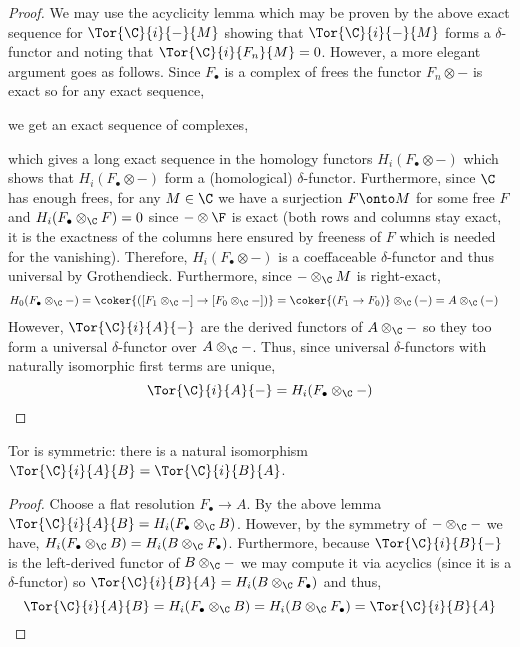 \documentclass[12pt]{article}
\begin{document}
\begin{proof}
We may use the acyclicity lemma which may be proven by the above exact sequence for $\Tor{\C}{i}{-}{M}$ showing that $\Tor{\C}{i}{-}{M}$ forms a $\delta$-functor and noting that $\Tor{\C}{i}{F_n}{M} = 0$. However, a more elegant argument goes as follows. Since $F_\bullet$ is a complex of frees the functor $F_n \otimes -$ is exact so for any exact sequence,
\begin{center}
\end{center}
we get an exact sequence of complexes,
\begin{center}
\end{center}
which gives a long exact sequence in the homology functors $H_i(F_\bullet \otimes -)$ which shows that $H_i(F_\bullet \otimes -)$ form a (homological) $\delta$-functor. Furthermore, since $\C$ has enough frees, for any $M \in \C$ we have a surjection $F \onto M$ for some free $F$ and $H_i(F_\bullet \otimes_\C F) = 0$ since $- \otimes \F$ is exact (both rows and columns stay exact, it is the exactness of the columns here ensured by freeness of $F$ which is needed for the vanishing). Therefore,  $H_i(F_\bullet \otimes -)$ is a coeffaceable $\delta$-functor and thus universal by Grothendieck. Furthermore, since $- \otimes_\C M$ is right-exact,
\begin{align*}
H_0(F_\bullet \otimes_\C -) & = \coker{([F_1 \otimes_\C -] \to [F_0 \otimes_\C -])} = \coker{(F_1 \to F_0)} \otimes_\C (-) = A \otimes_\C (-)
\end{align*}
However, $\Tor{\C}{i}{A}{-}$ are the derived functors of $A \otimes_\C -$ so they too form a universal $\delta$-functor over $A \otimes_\C -$. Thus, since universal $\delta$-functors with naturally isomorphic first terms are unique,
\[ \Tor{\C}{i}{A}{-} = H_i(F_\bullet \otimes_\C -) \]
\end{proof}

\begin{prop}
Tor is symmetric: there is a natural isomorphism $\Tor{\C}{i}{A}{B} = \Tor{\C}{i}{B}{A}$.
\end{prop}

\begin{proof}
Choose a flat resolution $F_\bullet \to A$. By the above lemma $\Tor{\C}{i}{A}{B} = H_i(F_\bullet \otimes_\C B)$. However, by the symmetry of $- \otimes_\C -$ we have, $H_i(F_\bullet \otimes_\C B) = H_i(B \otimes_\C F_\bullet)$. Furthermore, because $\Tor{\C}{i}{B}{-}$ is the left-derived functor of $B \otimes_\C -$ we may compute it via acyclics (since it is a $\delta$-functor) so $\Tor{\C}{i}{B}{A} = H_i(B \otimes_\C F_\bullet)$ and thus,
\[ \Tor{\C}{i}{A}{B} = H_i(F_\bullet \otimes_\C B) = H_i(B \otimes_\C F_\bullet) = \Tor{\C}{i}{B}{A} \]
\end{proof}
\end{document}
